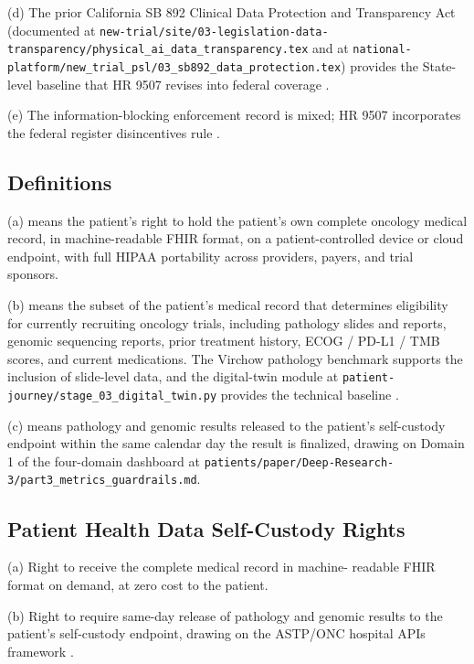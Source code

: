(d) The prior California SB 892 Clinical Data Protection and
Transparency Act (documented at
\texttt{new-trial/site/03-legislation-data-transparency/physical\_ai\_data\_transparency.tex}
and at
\texttt{national-platform/new\_trial\_psl/03\_sb892\_data\_protection.tex})
provides the State-level baseline that HR 9507 revises into federal
coverage \cite{kawchak_2026_19176370, kawchak_2026_19244918}.

(e) The information-blocking enforcement record is mixed; HR 9507
incorporates the federal register disincentives rule
\cite{federal_register_info_blocking_disincentives_2024}.

\subsection{Definitions}

(a)  means the patient's
right to hold the patient's own complete oncology medical record,
in machine-readable FHIR format, on a patient-controlled device or
cloud endpoint, with full HIPAA portability across providers,
payers, and trial sponsors.

(b)  means the subset of the
patient's medical record that determines eligibility for currently
recruiting oncology trials, including pathology slides and reports,
genomic sequencing reports, prior treatment history, ECOG / PD-L1 /
TMB scores, and current medications. The Virchow pathology
benchmark supports the inclusion of slide-level data, and the
digital-twin module at
\texttt{patient-journey/stage\_03\_digital\_twin.py} provides the
technical baseline \cite{vorontsov2024virchow,
kawchak_2026_19119939}.

(c)  means pathology and genomic results
released to the patient's self-custody endpoint within the same
calendar day the result is finalized, drawing on Domain 1 of the
four-domain dashboard at
\texttt{patients/paper/Deep-Research-3/part3\_metrics\_guardrails.md}.

\subsection{Patient Health Data Self-Custody Rights}

(a) Right to receive the complete medical record in machine-
readable FHIR format on demand, at zero cost to the patient.

(b) Right to require same-day release of pathology and genomic
results to the patient's self-custody endpoint, drawing on the
ASTP/ONC hospital APIs framework
\cite{astp_onc_hospital_apis_2024}.

